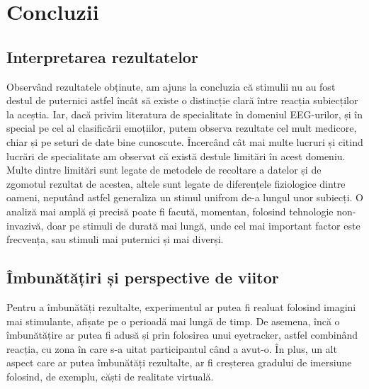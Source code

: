 \chapter{Concluzii}

\section{Interpretarea rezultatelor}

Observând rezultatele obținute, am ajuns la concluzia că stimulii nu au fost destul de puternici astfel încât să existe o distincție clară între reacția subiecților la aceștia. Iar, dacă privim literatura de specialitate în domeniul EEG-urilor, și în special pe cel al clasificării emoțiilor, putem observa rezultate cel mult medicore\cite{recreation_attempt}, chiar și pe seturi de date bine cunoscute. Încercând cât mai multe lucruri și citind lucrări de specialitate am observat că există destule limitări în acest domeniu. Multe dintre limitări sunt legate de metodele de recoltare a datelor și de zgomotul rezultat de acestea, altele sunt legate de diferențele fiziologice dintre oameni, neputând astfel generaliza un stimul unifrom de-a lungul unor subiecți. O analiză mai amplă și precisă poate fi facută, momentan, folosind tehnologie non-invazivă, doar pe stimuli de durată mai lungă, unde cel mai important factor este frecvența, sau stimuli mai puternici și mai diverși. 

\section{Îmbunătățiri și perspective de viitor}

Pentru a îmbunătăți rezultalte, experimentul ar putea fi realuat folosind imagini mai stimulante, afișate pe o perioadă mai lungă de timp. De asemena, încă o îmbunătățire ar putea fi adusă și prin folosirea unui eyetracker, astfel combinând reacția, cu zona în care s-a uitat participantul când a avut-o. În plus, un alt aspect care ar putea îmbunătăți rezultalte, ar fi creșterea gradului de imersiune folosind, de exemplu, căști de realitate virtuală.